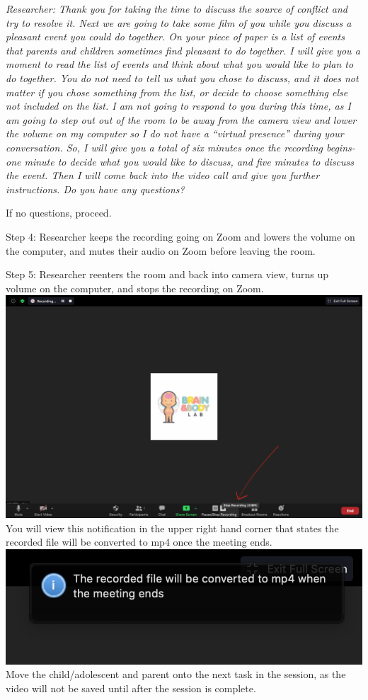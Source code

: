 \documentclass[]{book}
\begin{document}
\emph{Researcher: Thank you for taking the time to discuss the source of conflict and try to resolve it. Next we are going to take some film of you while you discuss a pleasant event you could do together. On your piece of paper is a list of events that parents and children sometimes find pleasant to do together. I will give you a moment to read the list of events and think about what you would like to plan to do together. You do not need to tell us what you chose to discuss, and it does not matter if you chose something from the list, or decide to choose something else not included on the list. I am not going to respond to you during this time, as I am going to step out out of the room to be away from the camera view and lower the volume on my computer so I do not have a ``virtual presence'' during your conversation. So, I will give you a total of six minutes once the recording begins- one minute to decide what you would like to discuss, and five minutes to discuss the event. Then I will come back into the video call and give you further instructions. Do you have any questions?}

If no questions, proceed.

Step 4:
Researcher keeps the recording going on Zoom and lowers the volume on the computer, and mutes their audio on Zoom before leaving the room.

Step 5:
Researcher reenters the room and back into camera view, turns up volume on the computer, and stops the recording on Zoom. \includegraphics{images/zoom_parent_child_interaction/5.png} You will view this notification in the upper right hand corner that states the recorded file will be converted to mp4 once the meeting ends. \includegraphics{images/zoom_parent_child_interaction/6.png} Move the child/adolescent and parent onto the next task in the session, as the video will not be saved until after the session is complete.
\end{document}
